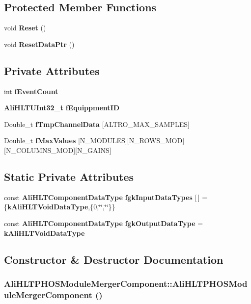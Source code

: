 \subsection*{Protected Member Functions}
\begin{CompactItemize}
\item 
void {\bf Reset} ()
\item 
void {\bf Reset\-Data\-Ptr} ()
\end{CompactItemize}
\subsection*{Private Attributes}
\begin{CompactItemize}
\item 
int {\bf f\-Event\-Count}
\item 
{\bf Ali\-HLTUInt32\_\-t} {\bf f\-Equippment\-ID}
\item 
Double\_\-t {\bf f\-Tmp\-Channel\-Data} [ALTRO\_\-MAX\_\-SAMPLES]
\item 
Double\_\-t {\bf f\-Max\-Values} [N\_\-MODULES][N\_\-ROWS\_\-MOD][N\_\-COLUMNS\_\-MOD][N\_\-GAINS]
\end{CompactItemize}
\subsection*{Static Private Attributes}
\begin{CompactItemize}
\item 
const {\bf Ali\-HLTComponent\-Data\-Type} {\bf fgk\-Input\-Data\-Types} [$\,$] = \{{\bf k\-Ali\-HLTVoid\-Data\-Type},\{0,\char`\"{}\char`\"{},\char`\"{}\char`\"{}\}\}
\item 
const {\bf Ali\-HLTComponent\-Data\-Type} {\bf fgk\-Output\-Data\-Type} = {\bf k\-Ali\-HLTVoid\-Data\-Type}
\end{CompactItemize}


\subsection{Constructor \& Destructor Documentation}
\subsubsection{\setlength{\rightskip}{0pt plus 5cm}Ali\-HLTPHOSModule\-Merger\-Component::Ali\-HLTPHOSModule\-Merger\-Component ()}\label{classAliHLTPHOSModuleMergerComponent_a0}




